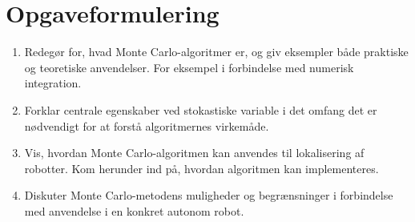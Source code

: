 \documentclass[../../SRP.tex]{subfiles}
\begin{document}
\section{Opgaveformulering}
  \begin{enumerate}[label=(\Roman*)]
  \item Redegør for, hvad Monte Carlo-algoritmer er, og giv eksempler både praktiske og teoretiske anvendelser. For eksempel i forbindelse med numerisk integration.

  \item Forklar centrale egenskaber ved stokastiske variable i det omfang det er nødvendigt for at forstå algoritmernes virkemåde.

  \item Vis, hvordan Monte Carlo-algoritmen kan anvendes til lokalisering af robotter. Kom herunder ind på, hvordan algoritmen kan implementeres.

  \item Diskuter Monte Carlo-metodens muligheder og begrænsninger i forbindelse med anvendelse i en konkret autonom robot.
  \end{enumerate}
\end{document}
